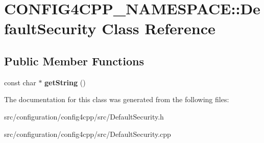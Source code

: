 \hypertarget{classCONFIG4CPP__NAMESPACE_1_1DefaultSecurity}{\section{C\-O\-N\-F\-I\-G4\-C\-P\-P\-\_\-\-N\-A\-M\-E\-S\-P\-A\-C\-E\-:\-:Default\-Security Class Reference}
\label{classCONFIG4CPP__NAMESPACE_1_1DefaultSecurity}
}
\subsection*{Public Member Functions}
\begin{DoxyCompactItemize}
\item 
\hypertarget{classCONFIG4CPP__NAMESPACE_1_1DefaultSecurity_a58f94dc9791231138cbab14151cc3f0a}{const char $\ast$ {\bfseries get\-String} ()}\label{classCONFIG4CPP__NAMESPACE_1_1DefaultSecurity_a58f94dc9791231138cbab14151cc3f0a}

\end{DoxyCompactItemize}


The documentation for this class was generated from the following files\-:\begin{DoxyCompactItemize}
\item 
src/configuration/config4cpp/src/Default\-Security.\-h\item 
src/configuration/config4cpp/src/Default\-Security.\-cpp\end{DoxyCompactItemize}
